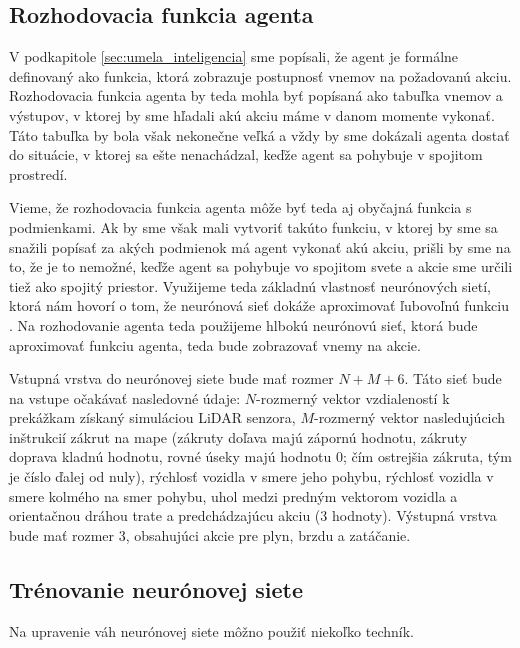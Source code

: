 \subsection{Rozhodovacia funkcia agenta}

V podkapitole \ref{sec:umela_inteligencia} sme popísali, že agent je formálne definovaný ako funkcia, ktorá zobrazuje postupnosť vnemov na požadovanú akciu. Rozhodovacia funkcia agenta by teda mohla byť popísaná ako tabuľka vnemov a výstupov, v ktorej by sme hľadali akú akciu máme v danom momente vykonať. Táto tabuľka by bola však nekonečne veľká a vždy by sme dokázali agenta dostať do situácie, v ktorej sa ešte nenachádzal, keďže agent sa pohybuje v spojitom prostredí.

Vieme, že rozhodovacia funkcia agenta môže byť teda aj obyčajná funkcia s podmienkami. Ak by sme však mali vytvoriť takúto funkciu, v ktorej by sme sa snažili popísať za akých podmienok má agent vykonať akú akciu, prišli by sme na to, že je to nemožné, keďže agent sa pohybuje vo spojitom svete a akcie sme určili tiež ako spojitý priestor. Využijeme teda základnú vlastnosť neurónových sietí, ktorá nám hovorí o tom, že neurónová sieť dokáže aproximovať ľubovoľnú funkciu \cite{artificial_intelligence_modern_aproach}. Na rozhodovanie agenta teda použijeme hlbokú neurónovú sieť, ktorá bude aproximovať funkciu agenta, teda bude zobrazovať vnemy na akcie.

Vstupná vrstva do neurónovej siete bude mať rozmer \(N + M + 6\). Táto sieť bude na vstupe očakávať nasledovné údaje: \(N\)-rozmerný vektor vzdialeností k prekážkam získaný simuláciou LiDAR senzora, \(M\)-rozmerný vektor nasledujúcich inštrukcií zákrut na mape (zákruty doľava majú zápornú hodnotu, zákruty doprava kladnú hodnotu, rovné úseky majú hodnotu 0; čím ostrejšia zákruta, tým je číslo ďalej od nuly), rýchlosť vozidla v smere jeho pohybu, rýchlosť vozidla v smere kolmého na smer pohybu, uhol medzi predným vektorom vozidla a orientačnou dráhou trate a predchádzajúcu akciu (3 hodnoty). Výstupná vrstva bude mať rozmer 3, obsahujúci akcie pre plyn, brzdu a zatáčanie.


\subsection{Trénovanie neurónovej siete}
Na upravenie váh neurónovej siete môžno použiť niekoľko techník. 

